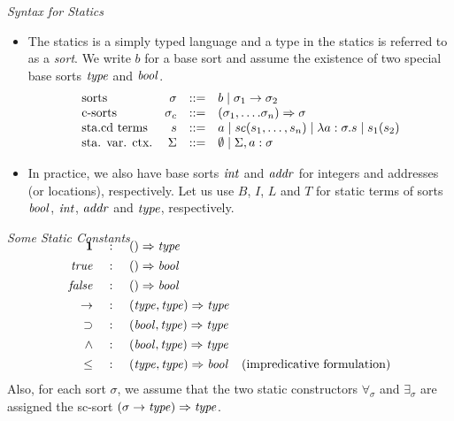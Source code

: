 \documentclass[pdf]{prosper}
\begin{document}
\def\saddr{{\it addr}}
\def\sbool{{\it bool}}
\def\simp{\rightarrow}
\def\Simp{\Rightarrow}
\def\sint{{\it int}}
\def\snat{{\it nat}}
\def\sprop{{\it prop}}
\def\stype{{\it type}}
\begin{slide}{{\em Syntax for Statics}}
\begin{itemize}
\item
The statics is a simply typed language and a type in the statics is
referred to as a {\em sort}. We write $b$ for a base sort and assume the
existence of two special base sorts $\stype$ and $\sbool$.
\[\begin{array}{lrcl}
\mbox{sorts} & \sigma & ::= & \basesort\mid\sigma_1\simp\sigma_2 \\
\mbox{c-sorts} & \sigma_c & ::= & (\sigma_1,\ldots.\sigma_n)\Simp\sigma \\
\mbox{sta.cd  terms} & s & ::= & a \mid \sc(s_1,\ldots,s_n) \mid \lambda a:\sigma.s \mid s_1(s_2) \\
\mbox{sta. var. ctx.} & \Sigma & ::= & \emptyset \mid \Sigma, a:\sigma \\
\end{array}\]
\item
In practice, we also have base sorts $\sint$ and $\saddr$ for integers and
addresses (or locations), respectively.  Let us use $B$, $I$, $L$ and $T$
for static terms of sorts $\sbool$, $\sint$, $\saddr$ and $\stype$,
respectively.
\end{itemize}
\end{slide}
\def\Band{\land}
\def\Bimp{\supset}
\def\ttrue{{\it true}}
\def\ffalse{{\it false}}
\def\timp{\rightarrow}
\def\Timp{\Rightarrow}
\def\tbool{\mbox{\bf bool}}
\def\tint{\mbox{\bf int}}
\def\tleq{\leq}
\def\tpjg{\vdash}
\def\tunit{{\mathbf 1}}
\begin{slide}{\em Some Static Constants}
\[\begin{array}{rcll}
\\[-24pt]
\tunit & ~:~ & ()\Simp \stype \\[4pt]
\ttrue & ~:~ & ()\Simp \sbool \\[4pt]
\ffalse & ~:~ & ()\Simp \sbool \\[4pt]

\timp & ~:~ & (\stype,\stype) \Simp \stype \\[4pt]
\Bimp & ~:~ & (\sbool,\stype) \Simp \stype \\[4pt]

\Band & ~:~ & (\sbool,\stype) \Simp \stype \\[4pt]
\tleq & ~:~ & (\stype,\stype) \Simp \sbool & \mbox{(impredicative formulation)}\\
\end{array}\]
Also, for each sort $\sigma$, we assume that the two static constructors
$\forall_\sigma$ and $\exists_\sigma$ are assigned the sc-sort
$(\sigma\timp\stype)\Simp\stype$.
\vfill
\end{slide}
\end{document}
